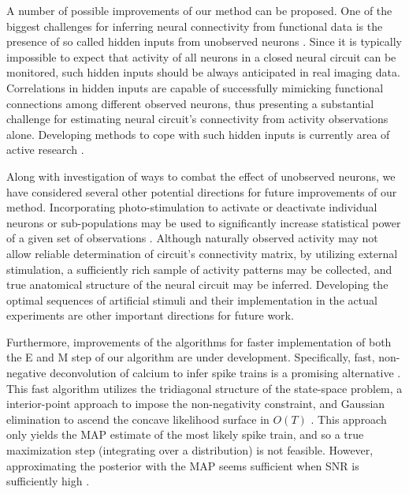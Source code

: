 \documentclass[aoas,preprint]{imsart}
\begin{document}
A number of possible improvements of our method can be proposed. One of the biggest challenges for inferring neural connectivity from functional data is the presence of so called hidden inputs from unobserved neurons \cite{Vidne08}. Since it is typically impossible to expect that activity of all neurons in a closed neural circuit can be monitored, such hidden inputs should be always anticipated in real imaging data. Correlations in hidden inputs are capable of successfully mimicking functional connections among different observed neurons, thus presenting a substantial challenge for estimating neural circuit's connectivity from activity observations alone. Developing methods to cope with such hidden inputs is currently area of active research \cite{Vidne08}.  %

Along with investigation of ways to combat the effect of unobserved neurons, we have considered several other potential directions for future improvements of our method.  Incorporating photo-stimulation to activate or deactivate individual neurons or sub-populations may be used to significantly increase statistical power of a given set of observations \cite{Deisseroth05,SzobotaIsacoff07}. %
Although naturally observed activity may not allow reliable determination of circuit's connectivity matrix, by utilizing external stimulation, a sufficiently rich sample of activity patterns may be collected, and true anatomical structure of the neural circuit may be inferred. Developing the optimal sequences of artificial stimuli and their implementation in the actual experiments are other important directions for future work.

Furthermore, improvements of the algorithms for faster implementation of both the E and M step of our algorithm are under development.  Specifically, fast, non-negative deconvolution of calcium to infer spike trains is a promising alternative \cite{Vogelstein08}.  This fast algorithm utilizes the tridiagonal structure of the state-space problem, a interior-point approach to impose the non-negativity constraint, and Gaussian elimination to ascend the concave likelihood surface in $O(T)$ \cite{Pan08b}.  This approach only yields the MAP estimate of the most likely spike train, and so a true maximization step (integrating over a distribution) is not feasible.  However, approximating the posterior with the MAP seems sufficient when SNR is sufficiently high \cite{Vogelstein08}.
\end{document}
